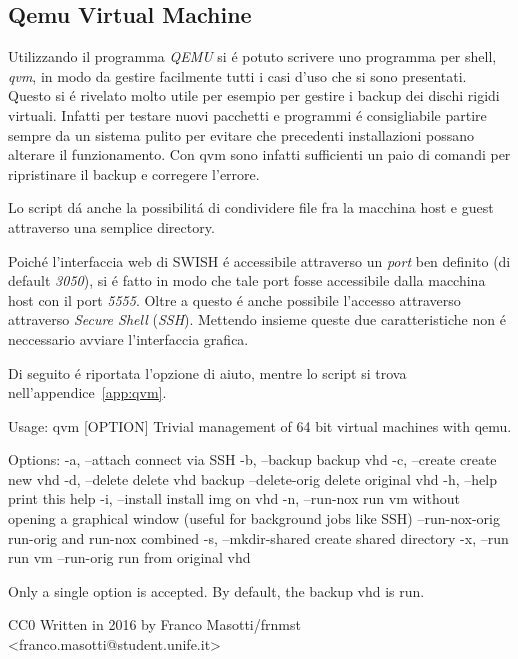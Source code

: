 \documentclass[10pt,titlepage,twoside,a4paper]{report}
\newenvironment{code}{\singlespacing\captionsetup{type=listing}}{}
\begin{document}
\subsection{Qemu Virtual Machine}
Utilizzando il programma \emph{QEMU}\cite{qemu} si \'e potuto scrivere uno 
programma per 
shell, \emph{qvm}, in modo da gestire facilmente tutti i casi d'uso che si 
sono presentati\cite{qvm}. Questo si \'e rivelato molto utile per esempio per 
gestire i backup dei dischi rigidi virtuali. Infatti per testare nuovi 
pacchetti e programmi \'e consigliabile partire sempre da un sistema pulito
per evitare che precedenti installazioni possano alterare il funzionamento.
Con qvm sono infatti sufficienti un paio di comandi per ripristinare il 
backup e corregere l'errore.

Lo script d\'a anche la possibilit\'a di condividere file fra la macchina host 
e guest attraverso una semplice directory.

Poich\'e l'interfaccia web di SWISH \'e accessibile attraverso un \emph{port} 
ben definito (di default \emph{3050}), si \'e fatto in modo che tale port 
fosse accessibile dalla macchina host con il port \emph{5555}. Oltre a questo 
\'e anche possibile l'accesso attraverso attraverso \emph{Secure 
Shell} (\emph{SSH}). Mettendo insieme queste due caratteristiche non \'e 
neccessario avviare l'interfaccia grafica.

Di seguito \'e riportata l'opzione di aiuto, mentre lo script si trova 
nell'appendice~\ref{app:qvm}.

\begin{code}
    \caption{Pagina di aiuto di qvm}
    \begin{textcode*}{}
Usage: qvm [OPTION]
Trivial management of 64 bit virtual machines with qemu.

Options:
    -a, --attach                connect via SSH
    -b, --backup                backup vhd
    -c, --create                create new vhd
    -d, --delete                delete vhd backup
        --delete-orig           delete original vhd
    -h, --help                  print this help
    -i, --install               install img on vhd
    -n, --run-nox               run vm without opening a graphical window
                                (useful for background jobs like SSH)
        --run-nox-orig          run-orig and run-nox combined
    -s, --mkdir-shared          create shared directory
    -x, --run                   run vm
        --run-orig              run from original vhd


Only a single option is accepted.
By default, the backup vhd is run.

CC0
Written in 2016 by Franco Masotti/frnmst <franco.masotti@student.unife.it>
    \end{textcode*}
\end{code}
\end{document}
